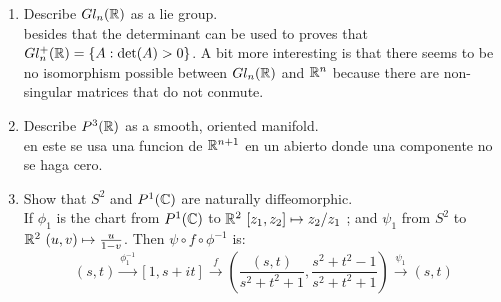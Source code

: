 \begin{enumerate}
\item Describe $Gl_n(\mathbb{R})$ as a lie group.\\
besides that the determinant can be used to proves that $Gl_n^+(\mathbb{R})=\{A: \det(A)>0 \}$. A bit more interesting is that there seems to be no isomorphism possible between $Gl_n(\mathbb{R})$ and $\mathbb{R}^n$ because there are non-singular matrices that do not conmute. 
\item Describe $P^3(\mathbb{R})$ as a smooth, oriented manifold.\\
en este se usa una funcion de $\mathbb{R}^{n+1}$ en un abierto donde una componente no se haga cero.
\item Show that $S^2$ and $P^1(\mathbb{C})$ are naturally diffeomorphic.\\
If $\phi_1$ is the chart from $P^1(\mathbb{C})$ to $\mathbb{R}^2\ [z_1,z_2] \mapsto z_2/z_1$ ; and $\psi_1$ from $S^2$ to $\mathbb{R}^2\ (u,v)\mapsto \frac{u}{1-v}$. Then $\psi\circ f \circ \phi^ {-1} $ is:
\begin{equation*}
(s,t) \xrightarrow{\phi_1^ {-1} }[1, s+it] \xrightarrow{f} \left( \frac{(s,t)}{s^2+t^2+1},\frac{s^2+t^2-1}{s^2+t^2+1} \right)\xrightarrow{\psi_1} (s,t)
\end{equation*}  
\end{enumerate}
